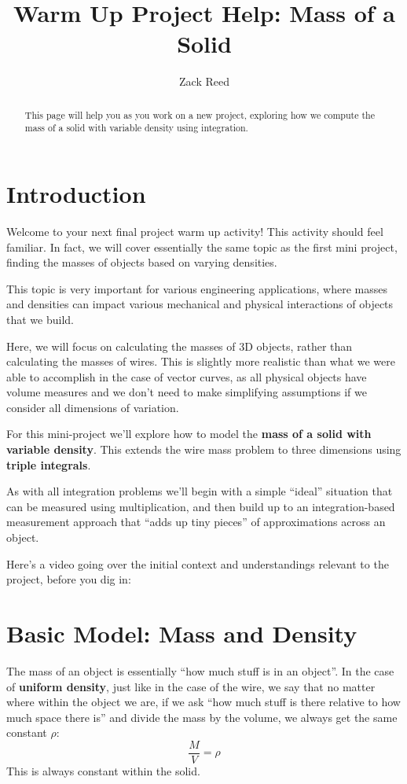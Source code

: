 \documentclass{ximera}
\title{Warm Up Project Help: Mass of a Solid}
\author{Zack Reed}
\begin{document}
\begin{abstract}
This page will help you as you work on a new project, exploring how we compute the mass of a solid with variable density using integration.
\end{abstract}
\maketitle



\section*{Introduction}

Welcome to your next final project warm up activity! This activity should feel familiar. In fact, we will cover essentially the same topic as the first mini project, finding the masses of objects based on varying densities. 

This topic is very important for various engineering applications, where masses and densities can impact various mechanical and physical interactions of objects that we build.

Here, we will focus on calculating the masses of 3D objects, rather than calculating the masses of wires. This is slightly more realistic than what we were able to accomplish in the case of vector curves, as all physical objects have volume measures and we don't need to make simplifying assumptions if we consider all dimensions of variation.

For this mini-project we'll explore how to model the \textbf{mass of a solid with variable density}. This extends the wire mass problem to three dimensions using \textbf{triple integrals}.

As with all integration problems we'll begin with a simple ``ideal'' situation that can be measured using multiplication, and then build up to an integration-based measurement approach that ``adds up tiny pieces'' of approximations across an object.

Here's a video going over the initial context and understandings relevant to the project, before you dig in:

\begin{center}
\end{center}

\section*{Basic Model: Mass and Density}
The mass of an object is essentially ``how much stuff is in an object''. In the case of \textbf{uniform density}, just like in the case of the wire, we say that no matter where within the object we are, if we ask ``how much stuff is there relative to how much space there is'' and divide the mass by the volume, we always get the same constant $\rho$:
\[
\frac{M}{V} = \rho
\]
This is always constant within the solid.
\end{document}
